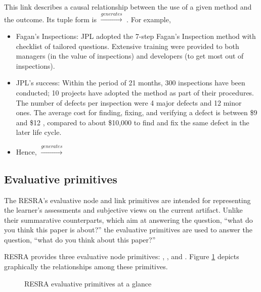 This link describes a causal relationship between the use of a given method
and the outcome. Its tuple form is  \(
\stackrel{generates}{\longrightarrow} \) . For
example,

\small
\begin{itemize}
\item {\sf Fagan's Inspections}: JPL adopted the 7-step Fagan's Inspection method
  with checklist of tailored questions. Extensive training were provided to
  both managers (in the value of inspections) and developers (to get most out
  of inspections).

\item {\sf JPL's success}: Within the period of 21 months, 300 inspections
  have been conducted; 10 projects have adopted the method as part of their
  procedures. The number of defects per inspection were 4 major defects and
  12 minor ones. The average cost for finding, fixing, and verifying a
  defect is between \$9 and \$12 , compared to about \$10,000 to find and
  fix the same defect in the later life cycle.
  
\item Hence,\hspace{0.1in} \(
\stackrel{generates}{\longrightarrow} \) 
\end{itemize}
\normalsize


\subsection{Evaluative primitives}
\label{sec:evaluative primitives}

The RESRA's evaluative node and link primitives are intended for
representing the learner's assessments and subjective views on the current
artifact.  Unlike their summarative counterparts, which aim at answering
the question, ``what do you think this paper is about?'' the evaluative
primitives are used to answer the question, ``what do you think about this
paper?''

RESRA provides three evaluative node primitives: ,
, and . Figure
\ref{fig:eval-resra} depicts graphically the relationships among these
primitives.

\begin{figure}[htb]
  \caption{RESRA evaluative primitives at a glance}
  \label{fig:eval-resra}
\end{figure}


